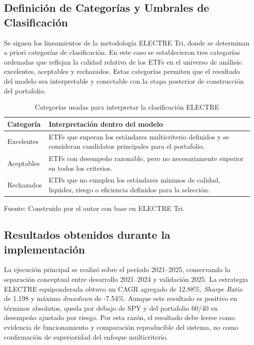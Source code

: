 \documentclass[12pt,letterpaper]{article}
\newcommand{\fuente}[1]{\begin{center}\small Fuente: #1\end{center}}
\begin{document}
\subsection{Definición de Categorías y Umbrales de Clasificación}

Se siguen los lineamientos de la metodología ELECTRE Tri, donde se determinan a priori categorías de clasificación. En este caso se establecieron tres categorías ordenadas que reflejan la calidad relativa de los ETFs en el universo de análisis: excelentes, aceptables y rechazados. Estas categorías permiten que el resultado del modelo sea interpretable y conectable con la etapa posterior de construcción del portafolio.

\begin{table}[H]
\centering
\caption{Categorías usadas para interpretar la clasificación ELECTRE}
\label{tab:categorias_electre}
\begin{tabular}{p{4cm}p{9cm}}
\toprule
\textbf{Categoría} & \textbf{Interpretación dentro del modelo} \\
\midrule
Excelentes & ETFs que superan los estándares multicriterio definidos y se consideran candidatos principales para el portafolio. \\
Aceptables & ETFs con desempeño razonable, pero no necesariamente superior en todos los criterios. \\
Rechazados & ETFs que no cumplen los estándares mínimos de calidad, liquidez, riesgo o eficiencia definidos para la selección. \\
\bottomrule
\end{tabular}
\end{table}
\fuente{Construido por el autor con base en ELECTRE Tri.}

\subsection{Resultados obtenidos durante la implementación}

La ejecución principal se realizó sobre el período 2021--2025, conservando la separación conceptual entre desarrollo 2021--2024 y validación 2025. La estrategia ELECTRE equiponderada obtuvo un CAGR agregado de 12.88\%, \textit{Sharpe Ratio} de 1.198 y máximo \textit{drawdown} de -7.54\%. Aunque este resultado es positivo en términos absolutos, queda por debajo de SPY y del portafolio 60/40 en desempeño ajustado por riesgo. Por esta razón, el resultado debe leerse como evidencia de funcionamiento y comparación reproducible del sistema, no como confirmación de superioridad del enfoque multicriterio.
\end{document}
